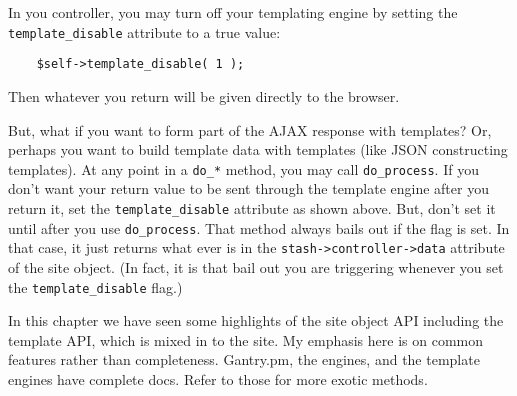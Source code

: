 In you controller, you may turn off your templating engine by setting
the \verb+template_disable+ attribute to a true value:

\begin{verbatim}
    $self->template_disable( 1 );
\end{verbatim}

Then whatever you return will be given directly to the browser.

But, what if you want to form part of the AJAX response with templates?
Or, perhaps you want to build template data with templates (like JSON
constructing templates).  At any point in a \verb+do_*+ method, you may
call \verb+do_process+.  If you don't want your return value to be
sent through the template engine after you return it, set the
\verb+template_disable+ attribute as shown above.  But, don't set
it until after you use \verb+do_process+.  That method always bails out
if the flag is set.  In that case, it just returns what ever is in the
\verb+stash->controller->data+ attribute of the site object.  (In fact,
it is that bail out you are triggering whenever you set the
\verb+template_disable+ flag.)

In this chapter we have seen some highlights of the site object API
including the template API, which is mixed in to the site.  My emphasis
here is on common features rather than completeness.  Gantry.pm, the
engines, and the template engines have complete docs.  Refer to those
for more exotic methods.
